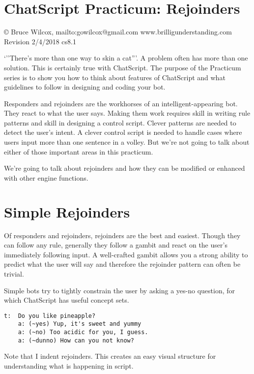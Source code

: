 \documentclass[]{article}
\date{}
\begin{document}
\section{ChatScript Practicum:
Rejoinders}\label{chatscript-practicum-rejoinders}

© Bruce Wilcox, mailto:gowilcox@gmail.com www.brilligunderstanding.com
Revision 2/4/2018 cs8.1

`''There's more than one way to skin a cat'''. A problem often has more
than one solution. This is certainly true with ChatScript. The purpose
of the Practicum series is to show you how to think about features of
ChatScript and what guidelines to follow in designing and coding your
bot.

Responders and rejoinders are the workhorses of an intelligent-appearing
bot. They react to what the user says. Making them work requires skill
in writing rule patterns and skill in designing a control script. Clever
patterns are needed to detect the user's intent. A clever control script
is needed to handle cases where users input more than one sentence in a
volley. But we're not going to talk about either of those important
areas in this practicum.

We're going to talk about rejoinders and how they can be modified or
enhanced with other engine functions.

\section{Simple Rejoinders}\label{simple-rejoinders}

Of responders and rejoinders, rejoinders are the best and easiest.
Though they can follow any rule, generally they follow a gambit and
react on the user's immediately following input. A well-crafted gambit
allows you a strong ability to predict what the user will say and
therefore the rejoinder pattern can often be trivial.

Simple bots try to tightly constrain the user by asking a yes-no
question, for which ChatScript has useful concept sets.

\begin{verbatim}
t:  Do you like pineapple?
    a: (~yes) Yup, it's sweet and yummy
    a: (~no) Too acidic for you, I guess.
    a: (~dunno) How can you not know? 
\end{verbatim}

Note that I indent rejoinders. This creates an easy visual structure for
understanding what is happening in script.
\end{document}
